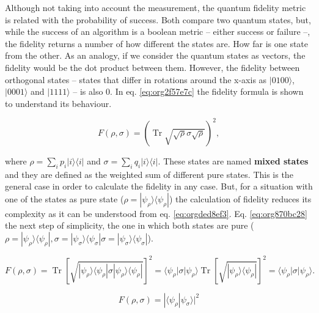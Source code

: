 Although not taking into account the measurement, the quantum fidelity metric is related with the probability of success.
Both compare two quantum states, but, while the success of an algorithm is a boolean metric -- either success or failure --, the fidelity returns a number of how different the states are.
How far is one state from the other.
As an analogy, if we consider the quantum states as vectors, the fidelity would be the dot product between them.
However, the fidelity between orthogonal states -- states that differ in rotations around the x-axis as \(| 0100 \rangle\), \(| 0001 \rangle\) and \(| 1111 \rangle\) -- is also 0.
In eq. \ref{eq:org2f57e7c} the fidelity formula is shown to understand its behaviour.

\begin{equation}
\label{eq:org2f57e7c}
{\displaystyle F(\rho ,\sigma )=\left(\operatorname {Tr} {\sqrt {{\sqrt {\rho }}\sigma {\sqrt {\rho }}}}\right)^{2},}
\end{equation}

where \(\rho =\sum _{i}p_{i}|i\rangle \langle i|\) and \(\sigma =\sum _{i}q_{i}|i\rangle \langle i|\).
These states are named \textbf{mixed states} and they are defined as the weighted sum of different pure states.
This is the general case in order to calculate the fidelity in any case.
But, for a situation with one of the states as pure state (\({\displaystyle \rho =|\psi _{\rho }\rangle \!\langle \psi _{\rho }|}\)) the calculation of fidelity reduces its complexity as it can be understood from eq. \ref{eq:orgded8ef3}.
Eq. \ref{eq:org870bc28} the next step of simplicity, the one in which both states are pure (\({\displaystyle \rho =|\psi _{\rho }\rangle \!\langle \psi _{\rho }|}, {\displaystyle \sigma =|\psi _{\sigma }\rangle \!\langle \psi _{\sigma }|} {\displaystyle \sigma =|\psi _{\sigma }\rangle \!\langle \psi _{\sigma }|}\)).


\begin{equation}
\label{eq:orgded8ef3}
{\displaystyle F(\rho ,\sigma )=\operatorname {Tr} \left[{\sqrt {|\psi _{\rho }\rangle \langle \psi _{\rho }|\sigma |\psi _{\rho }\rangle \langle \psi _{\rho }|}}\right]^{2}=\langle \psi _{\rho }|\sigma |\psi _{\rho }\rangle \operatorname {Tr} \left[{\sqrt {|\psi _{\rho }\rangle \langle \psi _{\rho }|}}\right]^{2}=\langle \psi _{\rho }|\sigma |\psi _{\rho }\rangle .}
\end{equation}

\begin{equation}
\label{eq:org870bc28}
{\displaystyle F(\rho ,\sigma )=|\langle \psi _{\rho }|\psi _{\sigma }\rangle |^{2}}
\end{equation}




